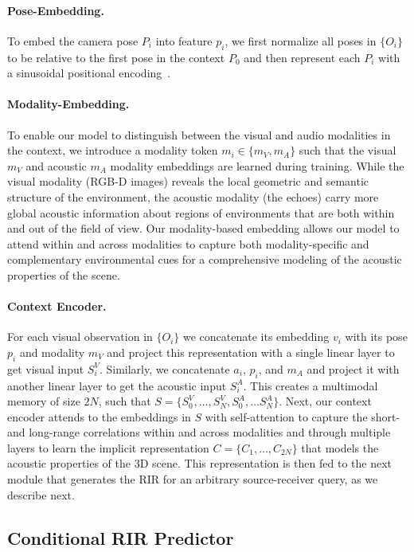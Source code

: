 \paragraph{Pose-Embedding.}
To embed the camera pose $P_i$ into feature $p_i$, we first normalize all poses in $\{O_i\}$ to be relative to the first pose in the context $P_0$ and then represent each $P_i$ with a sinusoidal positional encoding~\citep{vaswani2017attention}. 

\paragraph{Modality-Embedding.}
To enable our model to distinguish between the visual and audio modalities in the context, we introduce a modality token $m_i\in \{m_V, m_A\}$ such that the visual $m_V$ and acoustic $m_A$ modality embeddings are learned during training. While the visual modality (RGB-D images) reveals the local geometric and semantic structure of the environment, the acoustic modality (the echoes) carry more global acoustic information about regions of environments that are both within and out of the field of view. Our modality-based embedding allows our model to attend within and across modalities to capture both modality-specific and complementary environmental cues for a comprehensive modeling of the acoustic properties of the scene. 

\paragraph{Context Encoder.} For each visual observation in $\{O_i\}$ we concatenate its embedding $v_i$ with its pose $p_i$ and modality $m_V$ and project this representation with a single linear layer to get visual input $S^V_i$. Similarly, we concatenate $a_i$, $p_i$, and $m_A$ and project it with another linear layer to get the acoustic input $S^A_i$. This creates a multimodal memory of size $2N$, such that $S=\{S^V_0, \dots ,S^V_N, S^A_0, \dots S^A_N\}$. Next, our context encoder attends to the embeddings in $S$ with self-attention to capture the short- and long-range correlations within and across modalities and through multiple layers to learn the implicit representation $C=\{C_1, \dots , C_{2N}\}$ that models the acoustic properties of the 3D scene. This representation is then fed  to the next module that generates the RIR for an arbitrary source-receiver query, as we describe next. 

\subsection{Conditional RIR Predictor}\label{sec:rir_predictor}

